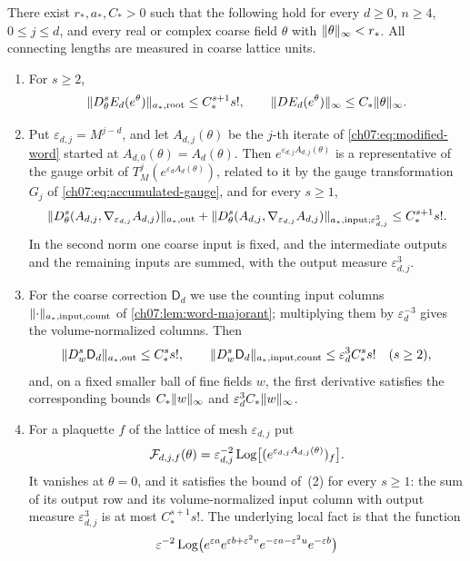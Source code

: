 \begin{theorem}\label{ch07:thm:all-root-classical}
There exist $r_*,a_*,C_*>0$ such that the following hold for every $d\ge0$, $n\ge4$, $0\le j\le d$, and every real or complex coarse field $\theta$ with $\lVert \theta\rVert_\infty<r_*$. All connecting lengths are measured in coarse lattice units.
\begin{enumerate}
\item For $s\ge2$,
\[
 \lVert D_\theta^sE_d(e^\theta)\rVert_{a_*,\mathrm{root}}\le C_*^{s+1}s!,\qquad\lVert DE_d(e^\theta)\rVert_\infty\le C_*\lVert \theta\rVert_\infty .
\]
\item Put $\varepsilon_{d,j}=M^{j-d}$, and let $A_{d,j}(\theta)$ be the $j$-th iterate of \eqref{ch07:eq:modified-word} started at $A_{d,0}(\theta)=A_d(\theta)$. Then $e^{\varepsilon_{d,j}A_{d,j}(\theta)}$ is a representative of the gauge orbit of $T_M^j(e^{\varepsilon_dA_d(\theta)})$, related to it by the gauge transformation $G_j$ of \eqref{ch07:eq:accumulated-gauge}, and for every $s\ge1$,
\[
 \lVert D_\theta^s(A_{d,j},\nabla_{\varepsilon_{d,j}}A_{d,j})\rVert_{a_*,\mathrm{out}}
 +\lVert D_\theta^s(A_{d,j},\nabla_{\varepsilon_{d,j}}A_{d,j})\rVert_{a_*,\mathrm{input};\varepsilon_{d,j}^3}\le C_*^{s+1}s! .
\]
In the second norm one coarse input is fixed, and the intermediate outputs and the remaining inputs are summed, with the output measure $\varepsilon_{d,j}^3$.
\item For the coarse correction $\mathsf D_d$ we use the counting input columns $\lVert \cdot\rVert_{a_*,\mathrm{input,count}}$ of \cref{ch07:lem:word-majorant}; multiplying them by $\varepsilon_d^{-3}$ gives the volume-normalized columns. Then
\[
 \lVert D_w^s\mathsf D_d\rVert_{a_*,\mathrm{out}}\le C_*^ss!,\qquad
 \lVert D_w^s\mathsf D_d\rVert_{a_*,\mathrm{input,count}}\le\varepsilon_d^3C_*^ss!\quad(s\ge2),
\]
and, on a fixed smaller ball of fine fields $w$, the first derivative satisfies the corresponding bounds $C_*\lVert w\rVert_\infty$ and $\varepsilon_d^3C_*\lVert w\rVert_\infty$.
\item For a plaquette $f$ of the lattice of mesh $\varepsilon_{d,j}$ put
\[
 \mathcal F_{d,j,f}(\theta)=\varepsilon_{d,j}^{-2}\operatorname{Log}\bigl[(e^{\varepsilon_{d,j}A_{d,j}(\theta)})_f\bigr].
\]
It vanishes at $\theta=0$, and it satisfies the bound of~(2) for every $s\ge1$: the sum of its output row and its volume-normalized input column with output measure $\varepsilon_{d,j}^3$ is at most $C_*^{s+1}s!$. The underlying local fact is that the function
\[
 \varepsilon^{-2}\operatorname{Log}\bigl(e^{\varepsilon a}e^{\varepsilon b+\varepsilon^2v}e^{-\varepsilon a-\varepsilon^2u}e^{-\varepsilon b}\bigr)
\]
\end{enumerate}
\end{theorem}
